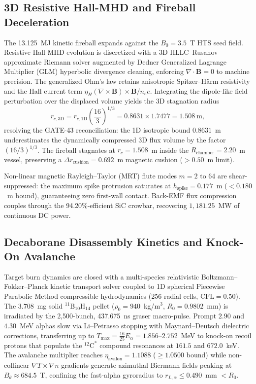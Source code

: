 \subsection{3D Resistive Hall-MHD and Fireball Deceleration}
\label{subsec:mhd3d}

The 13.125~MJ kinetic fireball expands against the $B_0 = 3.5$~T HTS seed
field.  Resistive Hall-MHD evolution is discretized with a 3D
HLLC--Rusanov approximate Riemann solver augmented by Dedner
Generalized Lagrange Multiplier (GLM) hyperbolic divergence cleaning,
enforcing $\nabla \cdot \mathbf{B} = 0$ to machine precision.  The
generalized Ohm's law retains anisotropic Spitzer--H{\"a}rm resistivity
and the Hall current term $\eta_H (\nabla \times \mathbf{B}) \times
\mathbf{B} / n_e e$.  Integrating the dipole-like field perturbation
over the displaced volume yields the 3D stagnation radius
\begin{equation}
    r_{c,\mathrm{3D}} = r_{c,\mathrm{1D}} \left(\frac{16}{3}\right)^{1/3}
    = 0.8631 \times 1.7477 = 1.508~\text{m},
\end{equation}
resolving the GATE-43 reconciliation: the 1D isotropic bound
$0.8631$~m underestimates the dynamically compressed 3D flux volume by
the factor $(16/3)^{1/3}$.  The fireball stagnates at $r_c = 1.508$~m
inside the $R_{\text{chamber}} = 2.20$~m vessel, preserving a
$\Delta r_{\text{cushion}} = 0.692$~m magnetic cushion
($> 0.50$~m limit).

Non-linear magnetic Rayleigh--Taylor (MRT) flute modes $m = 2$ to $64$
are shear-suppressed: the maximum spike protrusion saturates at
$h_{\text{spike}} = 0.177$~m ($< 0.180$~m bound), guaranteeing zero
first-wall contact.  Back-EMF flux compression couples through the
94.20\%-efficient SiC crowbar, recovering $1{,}181.25$~MW of continuous
DC power.

\subsection{Decaborane Disassembly Kinetics and Knock-On Avalanche}
\label{subsec:disassembly}

Target burn dynamics are closed with a multi-species relativistic
Boltzmann--Fokker--Planck kinetic transport solver coupled to 1D
spherical Piecewise Parabolic Method compressible hydrodynamics
(256 radial cells, $\mathrm{CFL} = 0.50$).  The $3.708$~mg solid
${}^{11}\mathrm{B}_{10}\mathrm{H}_{14}$ pellet ($\rho_0 = 940$~kg/m$^3$,
$R_0 = 0.9802$~mm) is irradiated by the 2,500-bunch, 437.675~ns graser
macro-pulse.  Prompt $2.90$ and $4.30$~MeV alphas slow via
Li--Petrasso stopping with Maynard--Deutsch dielectric corrections,
transferring up to $T_{\max} = \tfrac{16}{25}E_\alpha =
1.856$--$2.752$~MeV to knock-on recoil protons that populate the
$^{12}\mathrm{C}^*$ compound resonances at $161.5$ and $672.0$~keV.
The avalanche multiplier reaches $\eta_{\text{avalon}} = 1.1088$
($\ge 1.0500$ bound) while non-collinear $\nabla T \times \nabla n$
gradients generate azimuthal Biermann fields peaking at
$B_\theta \approx 684.5$~T, confining the fast-alpha gyroradius to
$r_{L,\alpha} \le 0.490$~mm $< R_0$.

